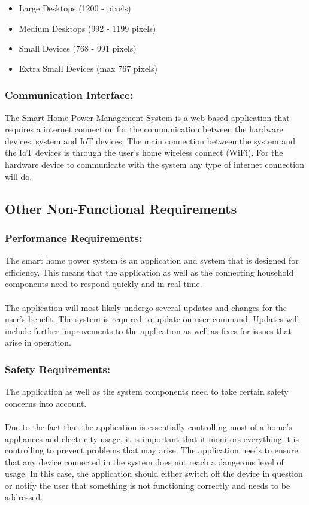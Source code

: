 \documentclass[10pt,twocolumn]{witseiepaper}
\begin{document}
	\begin{itemize}
		\item Large Desktops (1200 -  pixels)
		\item Medium Desktops (992 - 1199 pixels)
		\item Small Devices (768 - 991 pixels)
		\item Extra Small Devices (max 767 pixels)
	\end{itemize}
	
	\subsubsection{Communication Interface:}
	The Smart Home Power Management System is a web-based application that requires a internet connection for the communication between the hardware devices, system and IoT devices. The main connection between the system and the IoT devices is through the user's home wireless connect (WiFi). For the hardware device to communicate with the system any type of internet connection will do.
	
	\subsection{Other Non-Functional Requirements}
	
	\subsubsection{Performance Requirements:}
	The smart home power system is an application and system that is designed for efficiency. This means that the application as well as the connecting household components need to respond quickly and in real time. 
	\\\\
	The application will most likely undergo several updates and changes for the user's benefit. The system is required to update on user command. Updates will include further improvements to the application as well as fixes for issues that arise in operation.
	
	\subsubsection{Safety Requirements:} 
	The application as well as the system components need to take certain safety concerns into account. 
	\\\\
	Due to the fact that the application is essentially controlling most of a home's appliances and electricity usage, it is important that it monitors everything it is controlling to prevent problems that may arise. The application needs to ensure that any device connected in the system does not reach a dangerous level of usage. In this case, the application should either switch off the device in question or notify the user that something is not functioning correctly and needs to be addressed. 
	
\end{document}
